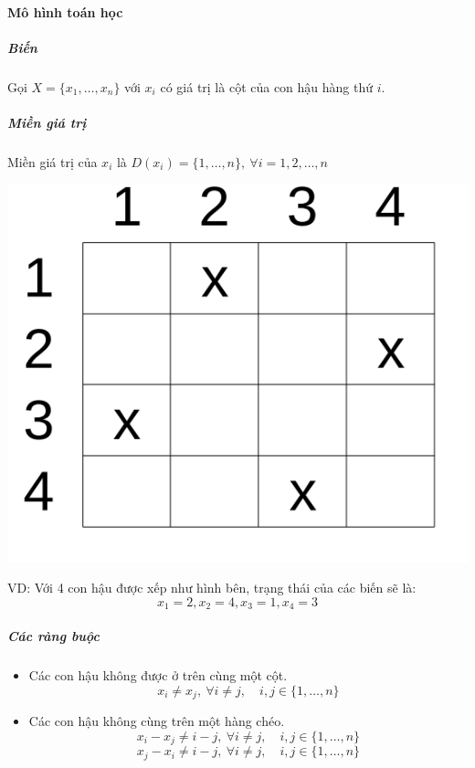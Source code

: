\documentclass[a4paper,12pt]{report}
\begin{document}
\paragraph{Mô hình toán học}
\subparagraph{Biến}
Gọi $X=\{x_1,\ldots,x_n\}$ với $x_i$ có giá trị là cột của con hậu hàng thứ $i$.
\subparagraph{Miền giá trị}
Miền giá trị của $x_i$ là $D(x_i)=\{1,\ldots,n\}, \ \forall i=1,2,\dots,n$\\[0.5cm]
\begin{minipage}{0.3\textwidth}
\includegraphics[width=\textwidth]{n-queen.png}
\end{minipage}
\begin{minipage}{0.6\textwidth}
VD: Với 4 con hậu được xếp như hình bên, trạng thái của các biến sẽ là: $$x_1=2,x_2=4,x_3=1,x_4=3$$
\end{minipage}
\subparagraph{Các ràng buộc}
\begin{itemize}
\item Các con hậu không được ở trên cùng một cột.
$$ x_i \neq x_j, \ \forall i \neq j, \quad i,j \in \{1,\dots,n\} $$
\item Các con hậu không cùng trên một hàng chéo.
$$x_i-x_j \neq i-j , \ \forall i \neq j, \quad i,j \in \{1,\dots,n\}$$
$$x_j-x_i \neq i-j, \ \forall i \neq j, \quad i,j \in \{1,\dots,n\}$$
\end{itemize} 
\end{document}
